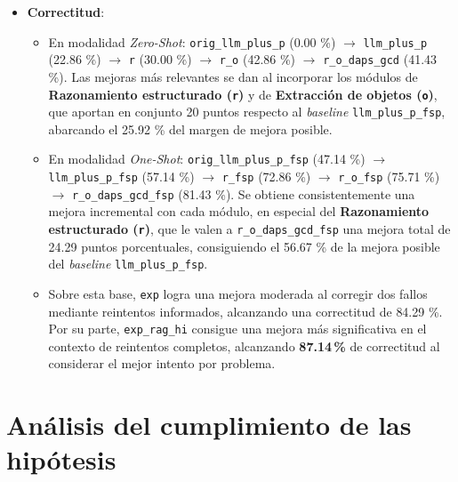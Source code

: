 \begin{itemize}
\begin{itemize}
	\end{itemize}
\item \textbf{Correctitud}:
	\begin{itemize}
	\item En modalidad \textit{Zero-Shot}: \texttt{orig\_llm\_plus\_p} (\textcolor[rgb]{0.0,0.00,0.0}{0.00 \%}) $\rightarrow$ \texttt{llm\_plus\_p} (\textcolor[rgb]{0.0,0.23,0.0}{22.86 \%}) $\rightarrow$ \texttt{r} (\textcolor[rgb]{0.0,0.30,0.0}{30.00 \%}) $\rightarrow$ \texttt{r\_o} (\textcolor[rgb]{0.0,0.43,0.0}{42.86 \%}) $\rightarrow$ \texttt{r\_o\_daps\_gcd} (\textcolor[rgb]{0.0,0.41,0.0}{41.43 \%}). Las mejoras más relevantes se dan al incorporar los módulos de \textbf{Razonamiento estructurado (\texttt{r})} y de \textbf{Extracción de objetos (\texttt{o})}, que aportan en conjunto \textcolor[rgb]{0.0,0.26,0.0}{20} puntos respecto al \textit{baseline} \texttt{llm\_plus\_p\_fsp}, abarcando el \textcolor[rgb]{0.0,0.26,0.0}{25.92 \%} del margen de mejora posible.
	\item En modalidad \textit{One-Shot}: \texttt{orig\_llm\_plus\_p\_fsp} (\textcolor[rgb]{0.0,0.47,0.0}{47.14 \%}) $\rightarrow$ \texttt{llm\_plus\_p\_fsp} (\textcolor[rgb]{0.0,0.57,0.0}{57.14 \%}) $\rightarrow$ \texttt{r\_fsp} (\textcolor[rgb]{0.0,0.73,0.0}{72.86 \%}) $\rightarrow$ \texttt{r\_o\_fsp} (\textcolor[rgb]{0.0,0.76,0.0}{75.71 \%}) $\rightarrow$ \texttt{r\_o\_daps\_gcd\_fsp} (\textcolor[rgb]{0.0,0.81,0.0}{81.43 \%}). Se obtiene consistentemente una mejora incremental con cada módulo, en especial del \textbf{Razonamiento estructurado (\texttt{r})}, que le valen a \texttt{r\_o\_daps\_gcd\_fsp} una mejora total de \textcolor[rgb]{0.0,0.57,0.0}{24.29} puntos porcentuales, consiguiendo el \textcolor[rgb]{0.0,0.57,0.0}{56.67 \%} de la mejora posible del \textit{baseline} \texttt{llm\_plus\_p\_fsp}.
	\item Sobre esta base, \texttt{exp} logra una mejora moderada al corregir dos fallos mediante reintentos informados, alcanzando una correctitud de \textcolor[rgb]{0.0,0.84,0.0}{84.29 \%}. Por su parte, \texttt{exp\_rag\_hi} consigue una mejora más significativa en el contexto de reintentos completos, alcanzando \textbf{\textcolor[rgb]{0.0,0.87,0.0}{87.14\,\%}} de correctitud al considerar el mejor intento por problema.
	\end{itemize}
\end{itemize}

\section{Análisis del cumplimiento de las hipótesis}

